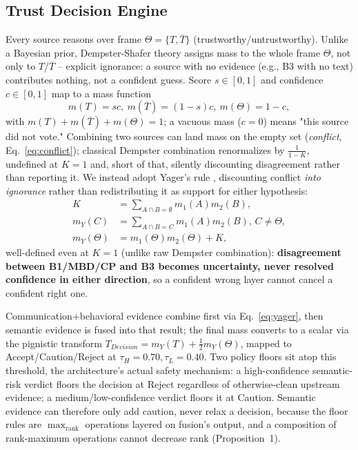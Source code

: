 \documentclass[conference]{IEEEtran}
\begin{document}
\subsection{Trust Decision Engine}
\label{sec:dstheory}
Every source reasons over frame $\Theta{=}\{T,\overline T\}$ (trustworthy/untrustworthy). Unlike a Bayesian prior, Dempster-Shafer theory assigns mass to the whole frame $\Theta$, not only to $T$/$\overline T$ -- explicit ignorance: a source with no evidence (e.g., B3 with no text) contributes nothing, not a confident guess. Score $s\in[0,1]$ and confidence $c\in[0,1]$ map to a mass function
\begin{equation}
m(T){=}sc,\ m(\overline T){=}(1{-}s)c,\ m(\Theta){=}1{-}c,
\label{eq:bba}
\end{equation}
with $m(T){+}m(\overline T){+}m(\Theta){=}1$; a vacuous mass ($c{=}0$) means "this source did not vote." Combining two sources can land mass on the empty set (\emph{conflict}, Eq.~\eqref{eq:conflict}); classical Dempster combination renormalizes by $\frac{1}{1-K}$, undefined at $K{=}1$ and, short of that, silently discounting disagreement rather than reporting it. We instead adopt Yager's rule \cite{r_ds_improved1,r_ds_improved2}, discounting conflict \emph{into ignorance} rather than redistributing it as support for either hypothesis:
\begin{align}
K &=\sum_{A\cap B=\emptyset}m_1(A)m_2(B), \label{eq:conflict}\\
m_Y(C) &{=}\!\!\sum_{A\cap B=C}\!\!m_1(A)m_2(B),\,C{\ne}\Theta, \nonumber\\
m_Y(\Theta) &{=}m_1(\Theta)m_2(\Theta){+}K, \label{eq:yager}
\end{align}
well-defined even at $K{=}1$ (unlike raw Dempster combination): \textbf{disagreement between B1/MBD/CP and B3 becomes uncertainty, never resolved confidence in either direction}, so a confident wrong layer cannot cancel a confident right one.

Communication+behavioral evidence combine first via Eq.~\eqref{eq:yager}, then semantic evidence is fused into that result; the final mass converts to a scalar via the pignistic transform $T_{Decision}{=}m_Y(T){+}\tfrac12 m_Y(\Theta)$, mapped to Accept/Caution/Reject at $\tau_H{=}0.70,\tau_L{=}0.40$. Two policy floors sit atop this threshold, the architecture's actual safety mechanism: a high-confidence semantic-risk verdict floors the decision at Reject regardless of otherwise-clean upstream evidence; a medium/low-confidence verdict floors it at Caution. Semantic evidence can therefore only add caution, never relax a decision, because the floor rules are $\max_{\mathrm{rank}}$ operations layered on fusion's output, and a composition of rank-maximum operations cannot decrease rank (Proposition~1).
\end{document}
